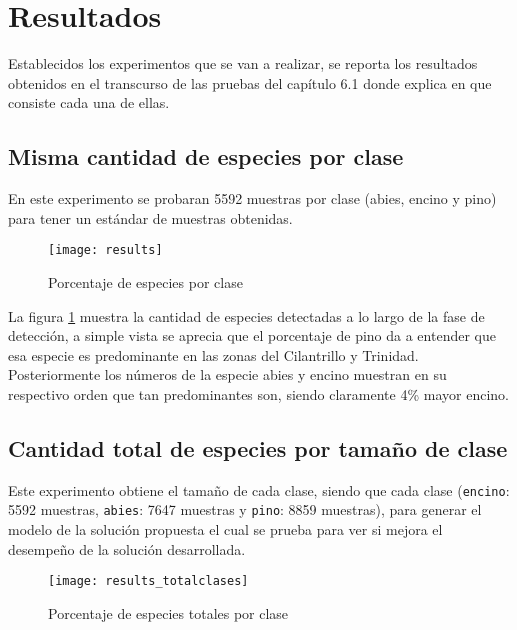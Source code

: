 \clearpage
\section{Resultados}
Establecidos los experimentos que se van a realizar, se reporta los resultados obtenidos en el transcurso de las pruebas del capítulo 6.1 donde explica en que consiste cada una de ellas.

\subsection{Misma cantidad de especies por clase}
En este experimento se probaran 5592 muestras por clase (abies, encino y pino) para tener un estándar de muestras obtenidas.

\begin{figure}[h!]
  \centering  
  \begin{minipage}[b]{0.7\textwidth}
        \texttt{[image: results]}
    \caption{Porcentaje de especies por clase} 
    \label{Porcentaje de especies por clase}
  \end{minipage}
\end{figure}

La figura \ref{Porcentaje de especies por clase} muestra la cantidad de especies detectadas a lo largo de la fase de detección, a simple vista se aprecia que el porcentaje de pino da a entender que esa especie es predominante en las zonas del Cilantrillo y Trinidad. Posteriormente los números de la especie abies y encino muestran en su respectivo orden que tan predominantes son, siendo claramente 4\% mayor encino.

\subsection{Cantidad total de especies por tamaño de clase}
Este experimento obtiene el tamaño de cada clase, siendo que cada clase (\texttt{encino}: 5592 muestras, \texttt{abies}: 7647 muestras y \texttt{pino}: 8859 muestras), para generar el modelo de la solución propuesta el cual se prueba para ver si mejora el desempeño de la solución desarrollada.

\begin{figure}[h!]
  \centering  
  \begin{minipage}[b]{0.75\textwidth}
        \texttt{[image: results\_totalclases]}
    \caption{Porcentaje de especies totales por clase} 
    \label{Porcentaje de especies totales por clase}
  \end{minipage}
\end{figure}

